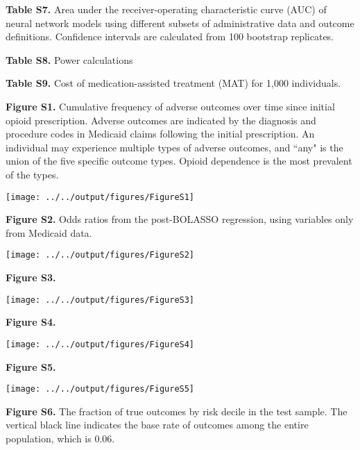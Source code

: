\documentclass[9pt,twoside,lineno]{pnas-new}
\begin{document}
\newpage

\textbf{Table S7.} Area under the receiver-operating characteristic curve (AUC) of neural network models using different subsets of administrative data and outcome definitions. Confidence intervals are calculated from 100 bootstrap replicates.

\scriptsize

\normalsize

\newpage

\textbf{Table S8.} Power calculations



\newpage

\textbf{Table S9.} Cost of medication-assisted treatment (MAT) for 1,000 individuals.



\newpage

\textbf{Figure S1.} Cumulative frequency of adverse outcomes over time since initial opioid prescription. Adverse outcomes are indicated by the diagnosis and procedure codes in Medicaid claims following the initial prescription. An individual may experience multiple types of adverse outcomes, and ``any" is the union of the five specific outcome types. Opioid dependence is the most prevalent of the types.

\texttt{[image: ../../output/figures/FigureS1]}

\newpage

\textbf{Figure S2.} Odds ratios from the post-BOLASSO regression, using variables only from Medicaid data.

\texttt{[image: ../../output/figures/FigureS2]}

\newpage

\textbf{Figure S3.}

\texttt{[image: ../../output/figures/FigureS3]}

\newpage

\textbf{Figure S4.}

\texttt{[image: ../../output/figures/FigureS4]}

\newpage

\textbf{Figure S5.}

\texttt{[image: ../../output/figures/FigureS5]}

\newpage

\textbf{Figure S6.} The fraction of true outcomes by risk decile in the test sample. The vertical black line indicates the base rate of outcomes among the entire population, which is 0.06.


\newpage


\end{document}
